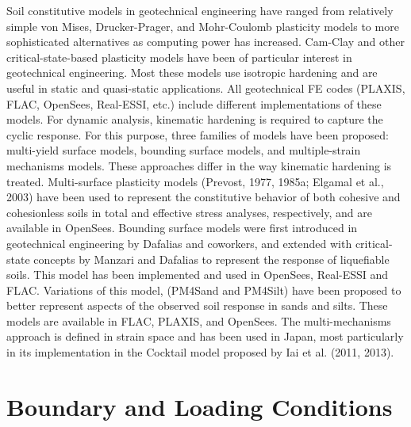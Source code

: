 Soil constitutive models in geotechnical engineering have ranged from relatively simple von Mises, Drucker-Prager, and Mohr-Coulomb plasticity models to more sophisticated alternatives as computing power has increased. Cam-Clay and other critical-state-based plasticity models have been of particular interest in geotechnical engineering. Most these models use isotropic hardening and are useful in static and quasi-static applications. All geotechnical FE codes (PLAXIS, FLAC, OpenSees, Real-ESSI, etc.) include different implementations of these models. For dynamic analysis, kinematic hardening is required to capture the cyclic response. For this purpose, three families of models have been proposed: multi-yield surface models, bounding surface models, and multiple-strain mechanisms models. These approaches differ in the way kinematic hardening is treated. Multi-surface plasticity models (Prevost, 1977, 1985a; Elgamal et al., 2003) have been used to represent the constitutive behavior of both cohesive and cohesionless soils in total and eﬀective stress analyses, respectively, and are available in OpenSees. Bounding surface models were first introduced in geotechnical engineering by Dafalias and coworkers, and extended with critical-state concepts by Manzari and Dafalias to represent the response of liquefiable soils. This model has been implemented and used in OpenSees, Real-ESSI and FLAC. Variations of this model, (PM4Sand and PM4Silt) have been proposed to better represent aspects of the observed soil response in sands and silts. These models are available in FLAC, PLAXIS, and OpenSees. The multi-mechanisms approach is defined in strain space and has been used in Japan, most particularly in its implementation in the Cocktail model proposed by Iai et al. (2011, 2013).

\section{Boundary and Loading Conditions}
\label{sec:resp_geotech_5}

